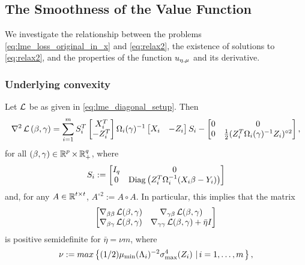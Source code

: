 \subsection{The Smoothness of the Value Function}
\label{sec:smoothness}
We investigate the relationship between the problems \eqref{eq:lme_loss_original_in_x}
and \eqref{eq:relax2}, the existence of solutions to 
 \eqref{eq:relax2}, and the properties of the function ${u_{\eta,\mu}}$ and its derivative.

\subsubsection{Underlying convexity}

\begin{lemma}\label{lem:LL weak cvx}
Let $\operatorname{\mathcal{L}}$ be as given in \eqref{eq:lme_diagonal_setup}. Then
\begin{equation}\label{eq:hess LL}
\nabla^2\operatorname{\mathcal{L}}{(\beta,\gamma)}=\sum_{i=1}^m
S_i^T\begin{bmatrix}X_i^T\\ -Z_i^T\end{bmatrix}
\Omega_i(\gamma)^{-1}
\begin{bmatrix}X_i& -Z_i\end{bmatrix}S_i
-\begin{bmatrix}
0&0\\ 0& \frac{1}{2}(Z_i^T\Omega_i(\gamma)^{-1}Z_i)^{\circ2}
\end{bmatrix},
\end{equation}
for all
$(\beta,\gamma)\in\operatorname{\mathbb{R}}^p\times\operatorname{\mathbb{R}}^q_+$, where 
\[
S_i:=\begin{bmatrix}
I_q&0\\ 0&\mathrm{Diag}\left(Z_i^T\Omega_i^{-1}(X_i\beta-Y_i)\right)
\end{bmatrix}
\]
and, for any $A\in\operatorname{\mathbb{R}}^{t\times t}$, $A^{\circ 2}:=A\circ A$. In particular, this implies
that the matrix
\begin{equation}\label{eq:psd for LL}
\begin{bmatrix}
\nabla_{\beta\beta}\operatorname{\mathcal{L}}(\beta,\gamma)&\nabla_{\gamma\beta}\operatorname{\mathcal{L}}(\beta,\gamma)\\
\nabla_{\beta\gamma}\operatorname{\mathcal{L}}(\beta,\gamma)&\nabla_{\gamma\gamma}\operatorname{\mathcal{L}}(\beta,\gamma)
+{\bar\eta} I\end{bmatrix}
\end{equation}
is positive semidefinite
for $\bar\eta= \nu m$, where
\[
\nu:=max\left\{(1/2) \mu_{\text{min}}(\Lambda_i)^{-2}\sigma^4_{\text{max}}(Z_i)\,\left|\,i=1,\dots,m\right.\right\},
\]
\end{lemma}
